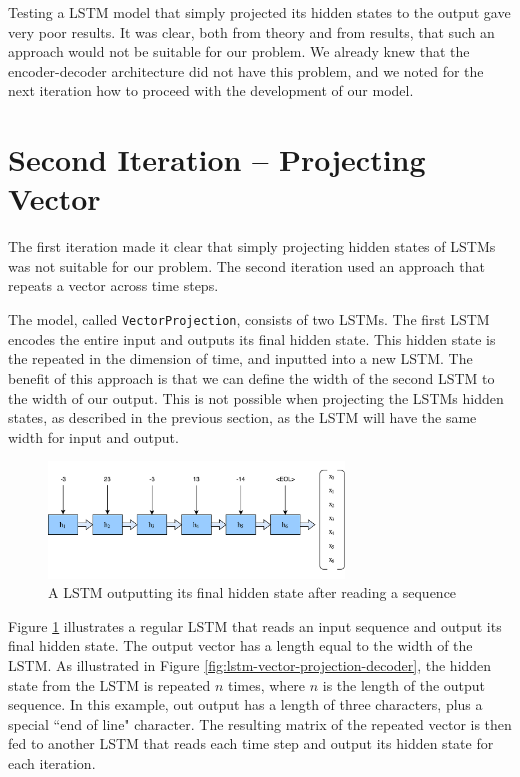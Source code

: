 Testing a LSTM model that simply projected its hidden states to the output gave very poor results. It was clear, both from theory and from results, that such an approach would not be suitable for our problem. We already knew that the encoder-decoder architecture did not have this problem, and we noted for the next iteration how to proceed with the development of our model. 


\section{Second Iteration -- Projecting Vector}
The first iteration made it clear that simply projecting hidden states of LSTMs was not suitable for our problem. The second iteration used an approach that repeats a vector across time steps.

The model, called {\tt VectorProjection}, consists of two LSTMs. The first LSTM encodes the entire input and outputs its final hidden state. This hidden state is the repeated in the dimension of time, and inputted into a new LSTM. The benefit of this approach is that we can define the width of the second LSTM to the width of our output. This is not possible when projecting the LSTMs hidden states, as described in the previous section, as the LSTM will have the same width for input and output.

\begin{figure}[ht]
    \centering
    \includegraphics[width=0.7\textwidth]{fig/development_process/lstm-vector-projection-encoder.pdf}
    \caption{A LSTM outputting its final hidden state after reading a sequence}
    \label{fig:lstm-vector-projection-encoder}
\end{figure}

Figure \ref{fig:lstm-vector-projection-encoder} illustrates a regular LSTM that reads an input sequence and output its final hidden state. The output vector has a length equal to the width of the LSTM. As illustrated in Figure \ref{fig:lstm-vector-projection-decoder}, the hidden state from the LSTM is repeated \(n\) times, where \(n\) is the length of the output sequence. In this example, out output has a length of three characters, plus a special ``end of line" character. The resulting matrix of the repeated vector is then fed to another LSTM that reads each time step and output its hidden state for each iteration.

